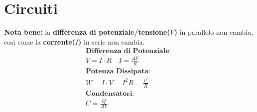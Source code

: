 \section{Circuiti}
\textbf{Nota bene: } la \textbf{differenza di potenziale/tensione($V$)} in parallelo non cambia, così come la \textbf{corrente($I$)} in serie non cambia.
\begin{gather*}
    \textbf{Differenza di Potenziale: } \\ V = I \cdot R \quad I = \frac{\Delta V}{R} \\
    \textbf{Potenza Dissipata: } \\
    W = I \cdot V = I^2 R = \frac{V^2}{R} \\
    \textbf{Condensatori: } \\ C = \frac{Q}{\Delta V}
\end{gather*}

